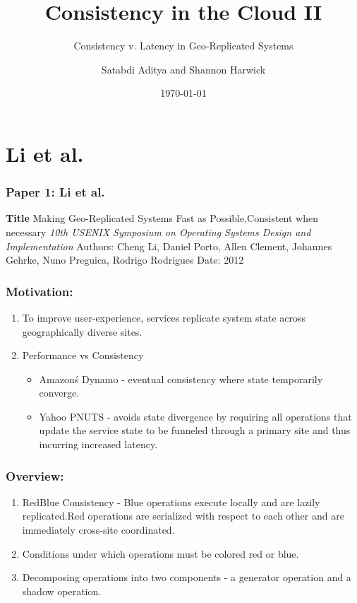 \documentclass{beamer}
\title{Consistency in the Cloud II}
\subtitle{Consistency v. Latency in Geo-Replicated Systems}
\author{Satabdi Aditya and Shannon Harwick}
\institute{University of Illinois at Chicago}
\date{\today}
\begin{document}

\section{Li et al.} 

\begin{frame}
\frametitle{Paper 1: Li et al.}

\textbf{Title} Making Geo-Replicated Systems Fast as Possible,Consistent when necessary\newline
\textit{10th USENIX Symposium on Operating Systems Design and Implementation} \newline
Authors: Cheng Li, Daniel Porto, Allen Clement, Johannes Gehrke, Nuno Preguica, Rodrigo Rodrigues\newline
Date: 2012\newline

\end{frame}


\begin{frame}
\frametitle{Motivation:}
\begin{enumerate}
\item To improve user-experience, services replicate  system state across geographically diverse sites.
\item Performance vs Consistency
\begin{itemize}
\item Amazon\'s Dynamo - eventual consistency where state temporarily converge.
\item Yahoo PNUTS - avoids state divergence by requiring all operations that update the service state to be funneled through a primary site and thus incurring increased latency.
\end{itemize}
\end{enumerate}

\end{frame}



\begin{frame}
\frametitle{Overview:}
\begin{enumerate}
\item RedBlue Consistency - Blue operations execute locally and are lazily replicated.Red operations are serialized with respect to each other and are immediately cross-site coordinated.
\item Conditions under which operations must be colored red or blue.
\item Decomposing operations into two components - a generator operation and a shadow operation.
\end{enumerate}

\end{frame}
\end{document}
